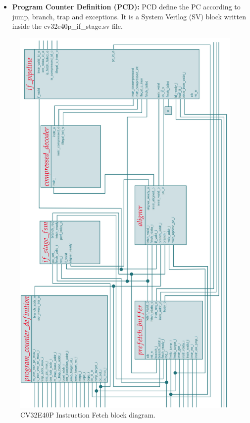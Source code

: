 {{{\begin{itemize}
        	    \item \textbf{Program Counter Definition (PCD):} PCD define the PC according to jump, branch, trap and exceptions. It is a System Verilog (SV) block written inside the cv32e40p\_if\_stage.sv file.
                
        	\end{itemize}
		    \begin{figure}[H]
        		\centering
        		\includegraphics[scale=0.16,center]{./images/block_diagram_if_stage.png}
        		\caption{CV32E40P Instruction Fetch block diagram.}
        		\label{fig:cv32e40p_block_diagram}
        	\end{figure} 
        	
		}
		
	}%

		

}